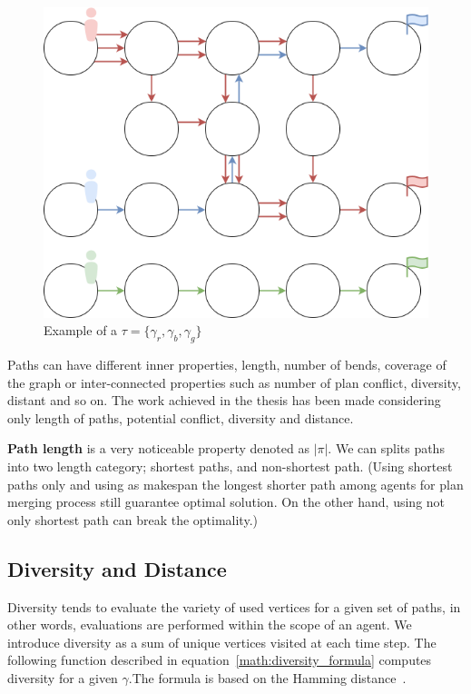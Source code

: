 \begin{figure}[H]
    \centering
    \caption{Example of a \(\tau = \{\gamma_r, \gamma_b, \gamma_g\}\)}\label{fig:ipf_example}
    \includegraphics[width=\widthimg]{img/ipf_example.drawio.png}
\end{figure}


Paths can have different inner properties, length, number of bends, coverage of the graph or inter-connected properties such as number of plan conflict, diversity, distant and so on. The work achieved in the thesis has been made considering only length of paths, potential conflict, diversity and distance.

\textbf{Path length} is a very noticeable property denoted as \(|\pi|\). We can splits paths into two length category; shortest paths, and non-shortest path. (Using shortest paths only and using as makespan the longest shorter path among agents for plan merging process still guarantee optimal solution. On the other hand, using not only shortest path can break the optimality.)

\subsection{Diversity and Distance}

Diversity tends to evaluate the variety of used vertices for a given set of paths, in other words, evaluations are performed within the scope of an agent. We introduce diversity as a sum of unique vertices visited at each time step. The following function described in equation~\ref{math:diversity_formula} computes diversity for a given \(\gamma\).The formula is based on the Hamming distance~\cite{hanaka2022computing}. 

